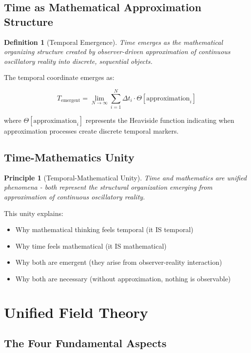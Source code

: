 \documentclass[11pt]{article}
\newtheorem{definition}[theorem]{Definition}
\newtheorem{principle}[theorem]{Principle}
\theoremstyle{remark}
\begin{document}
\subsection{Time as Mathematical Approximation Structure}

\begin{definition}[Temporal Emergence]
Time emerges as the mathematical organizing structure created by observer-driven approximation of continuous oscillatory reality into discrete, sequential objects.
\end{definition}

The temporal coordinate emerges as:

$$T_{\text{emergent}} = \lim_{N \to \infty} \sum_{i=1}^{N} \Delta t_i \cdot \Theta[\text{approximation}_i]$$

where $\Theta[\text{approximation}_i]$ represents the Heaviside function indicating when approximation processes create discrete temporal markers.

\subsection{Time-Mathematics Unity}

\begin{principle}[Temporal-Mathematical Unity]
Time and mathematics are unified phenomena - both represent the structural organization emerging from approximation of continuous oscillatory reality.
\end{principle}

This unity explains:
\begin{itemize}
\item Why mathematical thinking feels temporal (it IS temporal)
\item Why time feels mathematical (it IS mathematical)
\item Why both are emergent (they arise from observer-reality interaction)
\item Why both are necessary (without approximation, nothing is observable)
\end{itemize}

\section{Unified Field Theory}

\subsection{The Four Fundamental Aspects}
\end{document}
